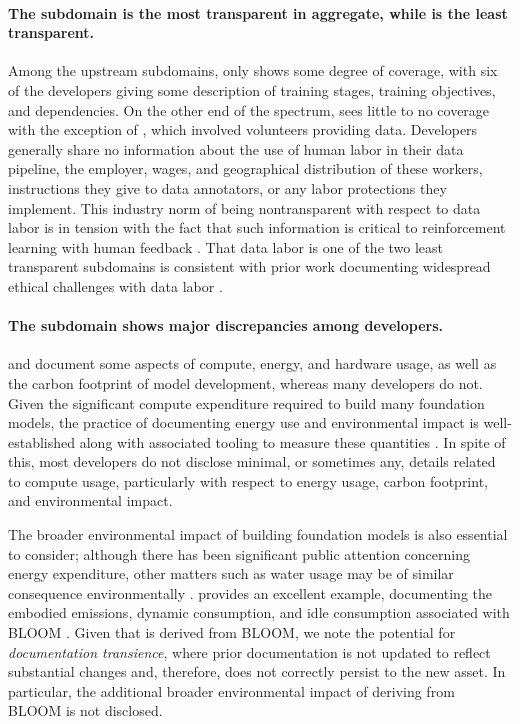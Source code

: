 \paragraph{The \methods subdomain is the most transparent in aggregate, while \labor is the least transparent.} 
Among the upstream subdomains, only \methods shows some degree of coverage, with six of the developers giving some description of training stages, training objectives, and dependencies.
On the other end of the spectrum, \labor sees little to no coverage with the exception of \bloomz, which involved volunteers providing data.
Developers generally share no information about the use of human labor in their data pipeline, the employer, wages, and geographical distribution of these workers, instructions they give to data annotators, or any labor protections they implement.
This industry norm of being nontransparent with respect to data labor is in tension with the fact that such information is critical to reinforcement learning with human feedback \citep{ziegler2019finetuning, ouyang2022instructions, casper2023open}.
That data labor is one of the two least transparent subdomains is consistent with prior work documenting widespread ethical challenges with data labor \citep{gray2019ghost, crawford2021atlas, hao2023cleaning}. 

\paragraph{The \compute subdomain shows major discrepancies among developers.} 
\meta and \stability document some aspects of compute, energy, and hardware usage, as well as the carbon footprint of model development, whereas many developers do not. 
Given the significant compute expenditure required to build many foundation models, the practice of documenting energy use and environmental impact is well-established along with associated tooling to measure these quantities \citep{lacoste2019quantifying,strubell2019energy,schwartz2020green,luccioni2023counting}. 
In spite of this, most developers do not disclose minimal, or sometimes any, details related to compute usage, particularly with respect to energy usage, carbon footprint, and environmental impact.

The broader environmental impact of building foundation models is also essential to consider; although there has been significant public attention concerning energy expenditure, other matters such as water usage may be of similar consequence environmentally \citep{luccioni2023counting}.
\citet{luccioni2022estimating} provides an excellent example, documenting the embodied emissions, dynamic consumption, and idle consumption associated with BLOOM \citep{scao2022bloom}.
Given that \bloomz is derived from BLOOM, we note the potential for \textit{documentation transience}, where prior documentation is not updated to reflect substantial changes and, therefore, does not correctly persist to the new asset. 
In particular, the additional broader environmental impact of deriving \bloomz from BLOOM is not disclosed.

